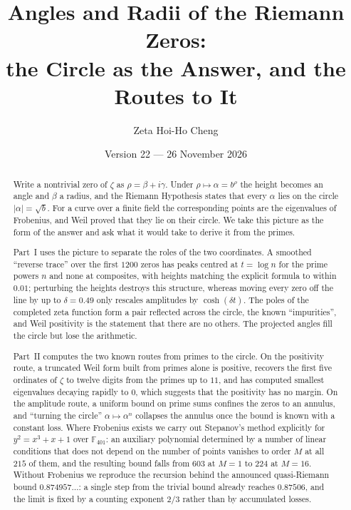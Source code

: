 \documentclass[11pt,a4paper]{article}
\title{Angles and Radii of the Riemann Zeros:\\ the Circle as the Answer, and the Routes to It}
\author{Zeta Hoi-Ho Cheng}
\date{Version 22 --- 26 November 2026}
\theoremstyle{definition}\newtheorem{definition}[proposition]{Definition}
\theoremstyle{remark}\newtheorem{remark}[proposition]{Remark}
\begin{document}
\maketitle

\begin{abstract}
Write a nontrivial zero of $\zeta$ as $\rho=\beta+i\gamma$. Under $\rho\mapsto\alpha=b^{\rho}$ the height becomes an angle and $\beta$ a radius, and the Riemann Hypothesis states that every $\alpha$ lies on the circle $|\alpha|=\sqrt b$. For a curve over a finite field the corresponding points are the eigenvalues of Frobenius, and Weil proved that they lie on their circle. We take this picture as the form of the answer and ask what it would take to derive it from the primes.

Part~I uses the picture to separate the roles of the two coordinates. A smoothed ``reverse trace'' over the first $1200$ zeros has peaks centred at $t=\log n$ for the prime powers $n$ and none at composites, with heights matching the explicit formula to within $0.01$; perturbing the heights destroys this structure, whereas moving every zero off the line by up to $\delta=0.49$ only rescales amplitudes by $\cosh(\delta t)$. The poles of the completed zeta function form a pair reflected across the circle, the known ``impurities'', and Weil positivity is the statement that there are no others. The projected angles fill the circle but lose the arithmetic.

Part~II computes the two known routes from primes to the circle. On the positivity route, a truncated Weil form built from primes alone is positive, recovers the first five ordinates of $\zeta$ to twelve digits from the primes up to $11$, and has computed smallest eigenvalues decaying rapidly to $0$, which suggests that the positivity has no margin. On the amplitude route, a uniform bound on prime sums confines the zeros to an annulus, and ``turning the circle'' $\alpha\mapsto\alpha^n$ collapses the annulus once the bound is known with a constant loss. Where Frobenius exists we carry out Stepanov's method explicitly for $y^2=x^3+x+1$ over $\mathbb F_{401}$: an auxiliary polynomial determined by a number of linear conditions that does not depend on the number of points vanishes to order $M$ at all $215$ of them, and the resulting bound falls from $603$ at $M=1$ to $224$ at $M=16$. Without Frobenius we reproduce the recursion behind the announced quasi-Riemann bound $0.874957\ldots$: a single step from the trivial bound already reaches $0.87506$, and the limit is fixed by a counting exponent $2/3$ rather than by accumulated losses.


\end{abstract}
\end{document}
